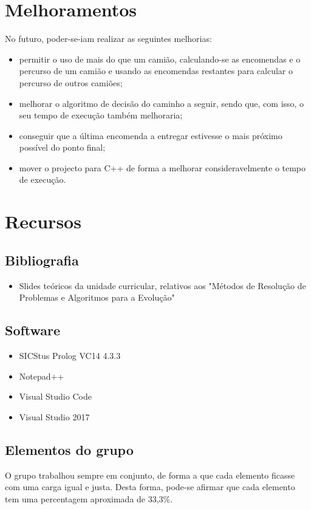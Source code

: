 \documentclass[a4paper]{article}
\begin{document}
\newpage

\section{Melhoramentos}

No futuro, poder-se-iam realizar as seguintes melhorias:
\begin{itemize}
	\item permitir o uso de mais do que um camião, calculando-se as encomendas e o percurso de um camião e usando as encomendas restantes para calcular o percurso de outros camiões;
	\item melhorar o algoritmo de decisão do caminho a seguir, sendo que, com isso, o seu tempo de execução também melhoraria;
	\item conseguir que a última encomenda a entregar estivesse o mais próximo possível do ponto final;
	\item mover o projecto para C++ de forma a melhorar consideravelmente o tempo de execução.
\end{itemize}

\newpage

\section{Recursos}

\subsection{Bibliografia}
\begin{itemize}
	\item Slides teóricos da unidade curricular, relativos aos "Métodos de Resolução de Problemas e Algoritmos para a Evolução"
\end{itemize}

\subsection{Software}
\begin{itemize}
	\item SICStus Prolog VC14 4.3.3
	\item Notepad++
	\item Visual Studio Code
	\item Visual Studio 2017
\end{itemize}

\subsection{Elementos do grupo}
O grupo trabalhou sempre em conjunto, de forma a que cada elemento ficasse com uma carga igual e justa. Desta forma, pode-se afirmar que cada elemento tem uma percentagem aproximada de 33,3\%.
\end{document}
